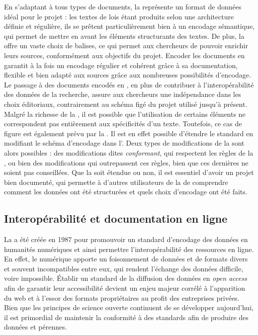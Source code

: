 En s'adaptant à tous types de documents, la \TEI représente un format de données idéal pour le projet \COREL : les textes de lois étant produits selon une architecture définie et régulière, ils se prêtent particulièrement bien à un encodage sémantique, qui permet de mettre en avant les éléments structurants des textes. De plus, la \TEI offre un vaste choix de balises, ce qui permet aux chercheurs de pouvoir enrichir leurs sources, conformément aux objectifs du projet. Encoder les documents en \TEI garantit à la fois un encodage régulier et cohérent grâce à sa documentation, flexible et bien adapté aux sources grâce aux nombreuses possibilités d'encodage. Le passage à des documents encodés en \TEI, en plus de contribuer à l'interopérabilité des données de la recherche, assure aux chercheurs une indépendance dans les choix éditoriaux, contrairement au schéma figé du projet \LSC utilisé jusqu'à présent. Malgré la richesse de la \TEI, il est possible que l'utilisation de certains éléments ne correspondent pas entièrement aux spécificités d'un texte. Toutefois, ce cas de figure est également prévu par la \TEI. Il est en effet possible d'étendre le standard en modifiant le schéma d'encodage dans l'\ODD. Deux types de modifications de la \TEI sont alors possibles : des modifications dites \TEI \textit{conformant}, qui respectent les règles de la \TEI, ou bien des modifications qui outrepassent ces règles, bien que ces dernières ne soient pas conseillées. Que la \TEI soit étendue ou non, il est essentiel d'avoir un projet bien documenté, qui permette à d'autres utilisateurs de la \TEI de comprendre comment les données ont été structurées et quels choix d'encodage ont été faits. 

\subsection{Interopérabilité et documentation en ligne}

La \TEI a été créée en 1987 pour promouvoir un standard d'encodage des données en humanités numériques et ainsi permettre l'interopérabilité des ressources en ligne. En effet, le numérique apporte un foisonnement de données et de formats divers et souvent incompatibles entre eux, qui rendent l'échange des données difficile, voire impossible. Établir un standard de la diffusion des données en \textit{open access} afin de garantir leur accessibilité devient un enjeu majeur corrélé à l'apparition du web et à l'essor des formats propriétaires au profit des entreprises privées. Bien que les principes de science ouverte continuent de se développer aujourd'hui, il est primordial de maintenir la conformité à des standards afin de produire des données \fair et pérennes. 

